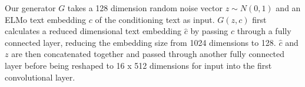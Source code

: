 Our generator $G$ takes a 128 dimension random noise vector $z \sim N(0, 1)$ and an ELMo text embedding $c$ of the conditioning text as input. $G(z, c)$ first calculates a reduced dimensional text embedding $\hat{c}$ by passing $c$ through a fully connected layer, reducing the embedding size from 1024 dimensions to 128. $\hat{c}$ and $z$ are then concatenated together and passed through another fully connected layer before being reshaped to 16 x 512 dimensions for input into the first convolutional layer.